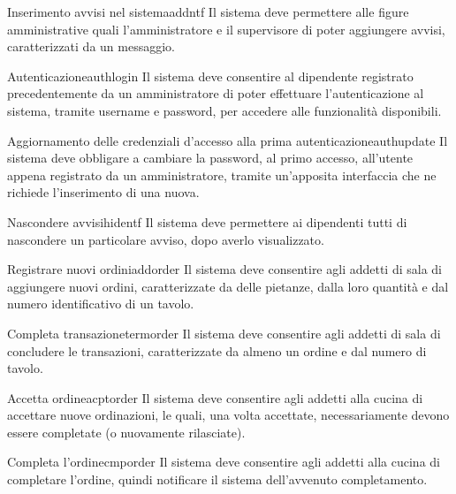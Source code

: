 	\begin{reqfr}{Inserimento avvisi nel sistema}{addntf}
		Il sistema deve permettere alle figure amministrative quali l'amministratore e il supervisore di poter aggiungere avvisi, caratterizzati da un messaggio.
	\end{reqfr}

	\begin{reqfr}{Autenticazione}{authlogin}
		Il sistema deve consentire al dipendente registrato precedentemente da un amministratore di poter effettuare l'autenticazione al sistema, tramite username e password, per accedere alle funzionalità disponibili.
	\end{reqfr}

	\begin{reqfr}{Aggiornamento delle credenziali d'accesso alla prima autenticazione}{authupdate}
		Il sistema deve obbligare a cambiare la password, al primo accesso, 
		all'utente appena registrato da un amministratore, tramite un'apposita interfaccia che ne richiede l'inserimento di una nuova.
	\end{reqfr}

	\begin{reqfr}{Nascondere avvisi}{hidentf}
		Il sistema deve permettere ai dipendenti tutti di nascondere un particolare avviso, 
		dopo averlo visualizzato.
	\end{reqfr}

	\begin{reqfr}{Registrare nuovi ordini}{addorder}
		Il sistema deve consentire agli addetti di sala di aggiungere nuovi ordini, 
		caratterizzate da delle pietanze, dalla loro quantità e dal numero identificativo di un tavolo.
	\end{reqfr}

	\begin{reqfr}{Completa transazione}{termorder}
		Il sistema deve consentire agli addetti di sala di concludere le transazioni, 
		caratterizzate da almeno un ordine e dal numero di tavolo.
	\end{reqfr}

	\begin{reqfr}{Accetta ordine}{acptorder}
		Il sistema deve consentire agli addetti alla cucina di accettare nuove ordinazioni, le quali, una volta accettate, necessariamente devono essere completate (o nuovamente rilasciate).
	\end{reqfr}

	\begin{reqfr}{Completa l'ordine}{cmporder}
		Il sistema deve consentire agli addetti alla cucina di completare l'ordine, quindi notificare il sistema dell'avvenuto completamento.
	\end{reqfr}

